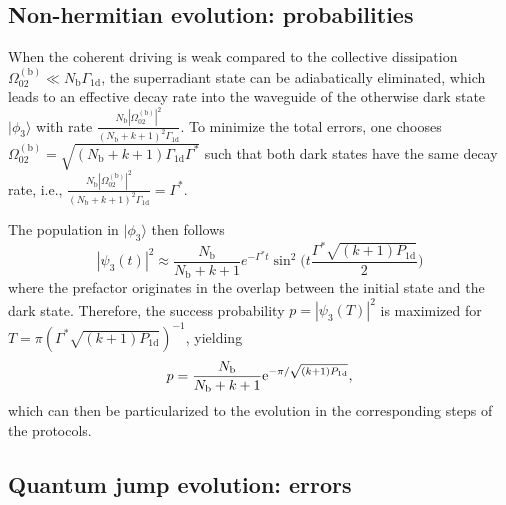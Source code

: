 \documentclass[twocolumn,pra,aps,superscriptaddress,showpacs]{revtex4-1}
\newcommand{\ket}[1]{|#1\rangle}
\def\oned{\mathrm{1d}}
\def\ee{\mathord{\rm e}}
\newcommand{\bb}{\mathrm{b}}
\begin{document}
\subsection{Non-hermitian evolution: probabilities}

When the coherent driving is weak compared to the collective dissipation $\Omega_{02}^{(\bb)} \ll N_\bb \Gamma_\oned$, the superradiant state can be adiabatically eliminated, which leads to an effective decay rate into the waveguide of the otherwise dark state $\ket{\phi_3}$ with rate  $\frac{N_\bb |\Omega_{02}^{(\bb)}|^2}{(N_\bb + k + 1)^2\Gamma_\oned}$. To minimize the total errors, one chooses $\Omega_{02}^{(\bb)} = \sqrt{(N_\bb + k +1) \Gamma_\oned \Gamma^*}$ such that both dark states have the same decay rate, i.e., $\frac{N_\bb |\Omega_{02}^{(\bb)}|^2}{(N_\bb + k + 1)^2\Gamma_\oned} = \Gamma^*$.

The population in $\ket{\phi_3}$ then follows 
\begin{equation}
|\psi_3(t)|^2
	\approx \frac{N_\bb}{N_\bb + k+1}e^{-\Gamma^*t } \sin^2\Big(t \frac{\Gamma^*\sqrt{(k+1)P_\oned}}{2}\Big)
\end{equation}
where the prefactor originates in the overlap between the initial state and the dark state. Therefore, the success probability $p=|\psi_3(T)|^2$ is maximized for $T = \pi \left( \Gamma^* \sqrt{ (k+1) P_\oned} \right)^{-1}$, yielding
\begin{equation}
p = \frac{N_\bb}{N_\bb + k+1} \ee^{- \pi / \sqrt{(k+1) P_\oned}},
\end{equation}
which can then be particularized to the evolution in the corresponding steps of the protocols.

\subsection{Quantum jump evolution: errors}
\end{document}

